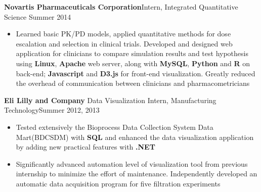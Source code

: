 \documentclass[10.5pt]{res} %
\begin{document}
\begin{resume}
\begin{itemize}
				\end{itemize}
				\textbf{Novartis Pharmaceuticals Corporation}\quad Intern, Integrated Quantitative Science   \hfill Summer 2014
				\begin{itemize}\itemsep -1pt
					\item Learned basic PK/PD models, applied quantitative methods  for dose escalation and selection in clinical  trials. Developed and designed web application for clinicians to compare simulation results and test hypothesis using \textbf{Linux}, \textbf{Apache} web server, along with \textbf{MySQL}, \textbf{Python} and \textbf{R} on back-end;  \textbf{Javascript}  and \textbf{D3.js} for front-end visualization. Greatly reduced the overhead of communication between clinicians and  pharmacometricians					
				\end{itemize}
                \textbf{Eli Lilly and Company} Data Visualization Intern, Manufacturing Technology\hfill Summer 2012, 2013
                \begin{itemize}\itemsep -1pt
                	\item Tested extensively the Bioprocess Data Collection System Data Mart(BDCSDM) with \textbf{SQL} and enhanced the data visualization application by adding new practical features with \textbf{.NET}
                \item Significantly advanced automation level of visualization tool  from previous internship to minimize the effort of maintenance. Independently developed an automatic data acquisition program for five filtration experiments

\end{itemize}
\end{resume}
\end{document}
